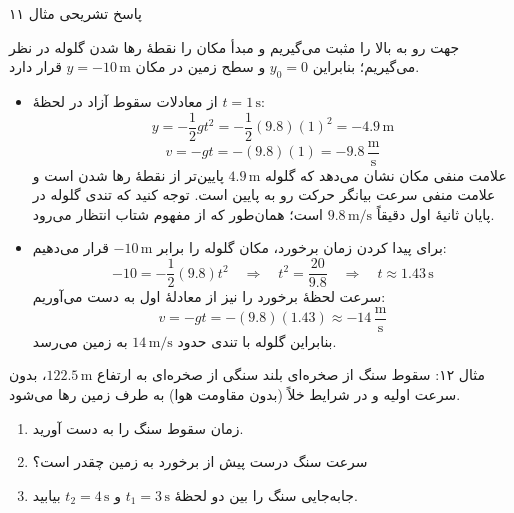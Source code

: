 \documentclass[12pt, a4paper]{article}
\begin{document}
\begin{answerbox}{پاسخ تشریحی مثال ۱۱}

جهت رو به بالا را مثبت می‌گیریم و مبدأ مکان را نقطهٔ رها شدن گلوله در نظر می‌گیریم؛ بنابراین $y_0 = 0$ و سطح زمین در مکان $y = -10\,\text{m}$ قرار دارد.

\begin{itemize}
    \item[الف)] از معادلات سقوط آزاد در لحظهٔ $t = 1\,\text{s}$:
    \[
    y = -\frac{1}{2}gt^2 = -\frac{1}{2}(9.8)(1)^2 = -4.9\,\text{m}
    \]
    \[
    v = -gt = -(9.8)(1) = -9.8\,\frac{\text{m}}{\text{s}}
    \]
    علامت منفی مکان نشان می‌دهد که گلوله $4.9\,\text{m}$ پایین‌تر از نقطهٔ رها شدن است و علامت منفی سرعت بیانگر حرکت رو به پایین است. توجه کنید که تندی گلوله در پایان ثانیهٔ اول دقیقاً $9.8\,\text{m/s}$ است؛ همان‌طور که از مفهوم شتاب انتظار می‌رود.

    \item[ب)] برای پیدا کردن زمان برخورد، مکان گلوله را برابر $-10\,\text{m}$ قرار می‌دهیم:
    \[
    -10 = -\frac{1}{2}(9.8)t^2 \quad \Longrightarrow \quad t^2 = \frac{20}{9.8} \quad \Longrightarrow \quad t \approx 1.43\,\text{s}
    \]
    سرعت لحظهٔ برخورد را نیز از معادلهٔ اول به دست می‌آوریم:
    \[
    v = -gt = -(9.8)(1.43) \approx -14\,\frac{\text{m}}{\text{s}}
    \]
    بنابراین گلوله با تندی حدود $14\,\text{m/s}$ به زمین می‌رسد.
\end{itemize}
\end{answerbox}

\begin{exambox}{مثال ۱۲: سقوط سنگ از صخره‌ای بلند}
سنگی از صخره‌ای به ارتفاع $122.5\,\text{m}$، بدون سرعت اولیه و در شرایط خلاً (بدون مقاومت هوا) به طرف زمین رها می‌شود.

\begin{enumerate}
    \item[الف)] زمان سقوط سنگ را به دست آورید.
    \item[ب)] سرعت سنگ درست پیش از برخورد به زمین چقدر است؟
    \item[پ)] جابه‌جایی سنگ را بین دو لحظهٔ $t_1 = 3\,\text{s}$ و $t_2 = 4\,\text{s}$ بیابید.
\end{enumerate}
\end{exambox}
\end{document}
